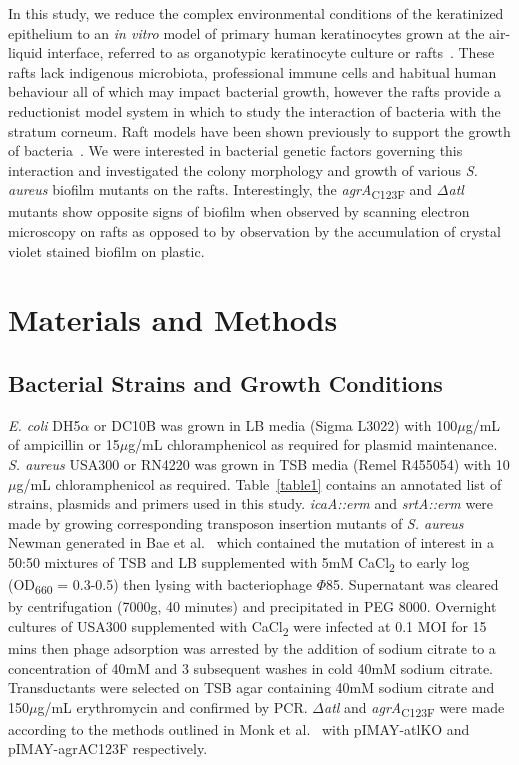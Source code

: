 \documentclass[10pt,letterpaper]{article}
\begin{document}
In this study, we reduce the complex environmental conditions of the keratinized epithelium to an \textit{in vitro} model of primary human keratinocytes grown at the air-liquid interface, referred to as organotypic keratinocyte culture or rafts~\cite{simpson_rna_2010}.
These rafts lack indigenous microbiota, professional immune cells and habitual human behaviour all of which may impact bacterial growth, however the rafts provide a reductionist model system in which to study the interaction of bacteria with the stratum corneum.
Raft models have been shown previously to support the growth of bacteria~\cite{breij_three-dimensional_2012, holland_microbial_2008, reijer_detection_2016}.
We were interested in bacterial genetic factors governing this interaction and investigated the colony morphology and growth of various \textit{S. aureus} biofilm mutants on the rafts.
Interestingly, the \textit{agrA}\textsubscript{C123F} and $\Delta$\textit{atl} mutants show opposite signs of biofilm when observed by scanning electron microscopy on rafts as opposed to by observation by the accumulation of crystal violet stained biofilm on plastic.

\section*{Materials and Methods}

\subsection*{Bacterial Strains and Growth Conditions}
\textit{E. coli} DH5$\alpha$ or DC10B was grown in LB media (Sigma L3022) with 100$\mu$g/mL of ampicillin or 15$\mu$g/mL chloramphenicol as required for plasmid maintenance.
\textit{S. aureus} USA300 or RN4220 was grown in TSB media (Remel R455054) with 10$\mu$g/mL chloramphenicol as required.
Table~\ref{table1} contains an annotated list of strains, plasmids and primers used in this study.
\textit{icaA::erm} and \textit{srtA::erm} were made by growing corresponding transposon insertion mutants of \textit{S. aureus} Newman generated in Bae et al.~\cite{bae_staphylococcus_2004} which contained the mutation of interest in a 50:50 mixtures of TSB and LB supplemented with 5mM CaCl\textsubscript{2} to early log (OD\textsubscript{660} = 0.3-0.5) then lysing with bacteriophage $\Phi$85.
Supernatant was cleared by centrifugation (7000g, 40 minutes) and precipitated in PEG 8000.
Overnight cultures of USA300 supplemented with CaCl\textsubscript{2} were infected at 0.1 MOI for 15 mins then phage adsorption was arrested by the addition of sodium citrate to a concentration of 40mM and 3 subsequent washes in cold 40mM sodium citrate.
Transductants were selected on TSB agar containing 40mM sodium citrate and 150$\mu$g/mL erythromycin and confirmed by PCR.
$\Delta$\textit{atl} and \textit{agrA}\textsubscript{C123F} were made according to the methods outlined in Monk et al.~\cite{monk_transforming_2012} with pIMAY-atlKO and pIMAY-agrAC123F respectively.
\end{document}
